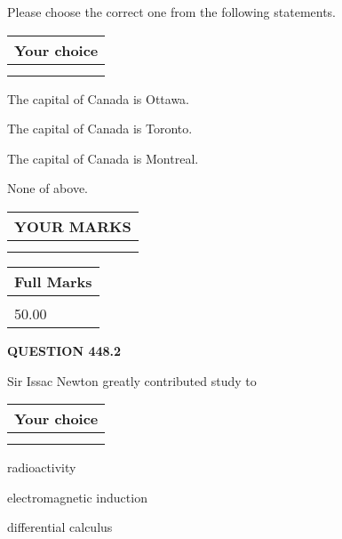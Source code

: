 \documentclass[12pt]{article}
\begin{document}
  
Please choose the correct one from the following statements.
  
  
\noindent\hspace{3.0in} \begin{tabular}{|l|}
\hline
Your choice \\
\hline
 \\ 
 \\ 
\hline
\end{tabular}
  
  
 
 
The capital of Canada is Ottawa.
 
 
The capital of Canada is Toronto.
 
 
The capital of Canada is Montreal.
 
 
 None of above.
 
 
  
\vspace{0.2in}
  
\noindent\begin{tabular}{|l|}
\hline
 YOUR MARKS  \\
\hline
 \\ 
 \\ 
\hline
\end{tabular}
\hspace{0.05in} \begin{tabular}{|l|}
\hline
 Full Marks  \\
\hline
 \\ 
50.00 \\
\hline
\end{tabular}
{\textbf{\Large{QUESTION
448.2 
}}}
  
  
Sir Issac Newton greatly contributed study to
  
  
\noindent\hspace{3.0in} \begin{tabular}{|l|}
\hline
Your choice \\
\hline
 \\ 
 \\ 
\hline
\end{tabular}
  
  
 
 
radioactivity
 
 
electromagnetic induction
 
 
differential calculus
 
\end{document}

